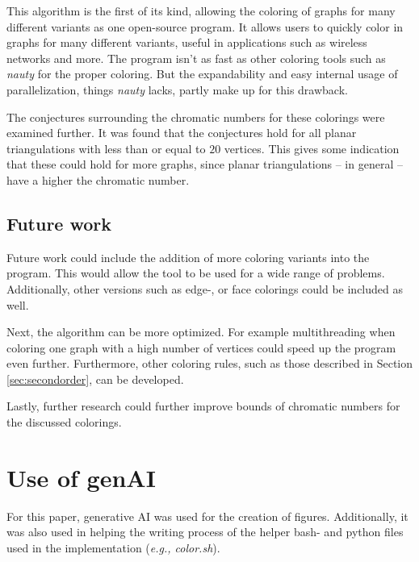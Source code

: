 \documentclass{article}
\begin{document}
This algorithm is the first of its kind, allowing the coloring of graphs for many different variants as one open-source program. It allows users to quickly color in graphs for many different variants, useful in applications such as wireless networks and more.
The program isn't as fast as other coloring tools such as \textit{nauty} for the proper coloring. But the expandability and easy internal usage of parallelization, things \textit{nauty} lacks, partly make up for this drawback. 

The conjectures surrounding the chromatic numbers for these colorings were examined further. It was found that the conjectures hold for all planar triangulations with less than or equal to $20$ vertices. This gives some indication that these could hold for more graphs, since planar triangulations -- in general -- have a higher the chromatic number. 


\subsection{Future work}

Future work could include the addition of more coloring variants into the program. This would allow the tool to be used for a wide range of problems. 
Additionally, other versions such as edge-, or face colorings could be included as well.

Next, the algorithm can be more optimized. For example multithreading when coloring one graph with a high number of vertices could speed up the program even further. Furthermore, other coloring rules, such as those described in Section \ref{sec:secondorder}, can be developed.

Lastly, further research could further improve bounds of chromatic numbers for the discussed colorings. 


\section*{Use of genAI}

For this paper, generative AI was used for the creation of figures. Additionally, it was also used in helping the writing process of the helper bash- and python files used in the implementation (\textit{e.g., color.sh}).



%

%

	
	
\end{document}
